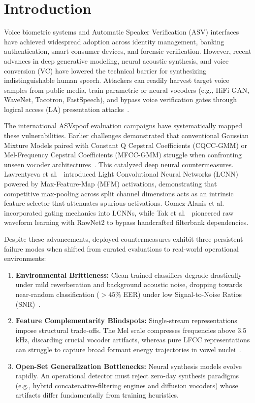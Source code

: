 \documentclass[runningheads]{llncs}
\begin{document}
\section{Introduction}
\label{sec:intro}
Voice biometric systems and Automatic Speaker Verification (ASV) interfaces have achieved widespread adoption across identity management, banking authentication, smart consumer devices, and forensic verification. However, recent advances in deep generative modeling, neural acoustic synthesis, and voice conversion (VC) have lowered the technical barrier for synthesizing indistinguishable human speech. Attackers can readily harvest target voice samples from public media, train parametric or neural vocoders (e.g., HiFi-GAN, WaveNet, Tacotron, FastSpeech), and bypass voice verification gates through logical access (LA) presentation attacks~\cite{todisco2019asvspoof,wu2015asvspoof,kinnunen2017asvspoof}.

The international ASVspoof evaluation campaigns have systematically mapped these vulnerabilities. Earlier challenges demonstrated that conventional Gaussian Mixture Models paired with Constant Q Cepstral Coefficients (CQCC-GMM) or Mel-Frequency Cepstral Coefficients (MFCC-GMM) struggle when confronting unseen vocoder architectures~\cite{sahidullah2015comparison,wang2021comparative}. This catalyzed deep neural countermeasures. Lavrentyeva et al.~\cite{lavrentyeva2017audio} introduced Light Convolutional Neural Networks (LCNN) powered by Max-Feature-Map (MFM) activations, demonstrating that competitive max-pooling across split channel dimensions acts as an intrinsic feature selector that attenuates spurious activations. Gomez-Alanis et al.~\cite{gomez2019light} incorporated gating mechanics into LCNNs, while Tak et al.~\cite{tak2021end} pioneered raw waveform learning with RawNet2 to bypass handcrafted filterbank dependencies.

Despite these advancements, deployed countermeasures exhibit three persistent failure modes when shifted from curated evaluations to real-world operational environments:
\begin{enumerate}
    \item \textbf{Environmental Brittleness:} Clean-trained classifiers degrade drastically under mild reverberation and background acoustic noise, dropping towards near-random classification ($>45\%$ EER) under low Signal-to-Noise Ratios (SNR)~\cite{zhang2021acoustic,paul2020impact}.
    \item \textbf{Feature Complementarity Blindspots:} Single-stream representations impose structural trade-offs. The Mel scale compresses frequencies above 3.5\,kHz, discarding crucial vocoder artifacts, whereas pure LFCC representations can struggle to capture broad formant energy trajectories in vowel nuclei~\cite{wang2021comparative}.
    \item \textbf{Open-Set Generalization Bottlenecks:} Neural synthesis models evolve rapidly. An operational detector must reject zero-day synthesis paradigms (e.g., hybrid concatenative-filtering engines and diffusion vocoders) whose artifacts differ fundamentally from training heuristics.
\end{enumerate}
\end{document}
